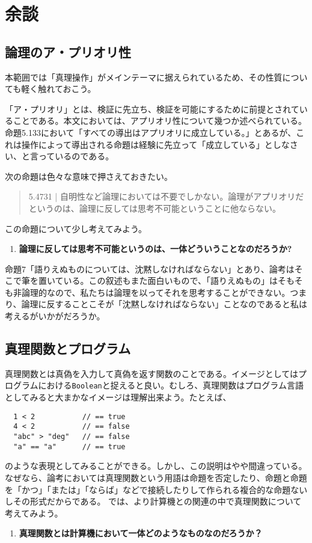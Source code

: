 \documentclass[a4paper,onecolumn,article]{jarticle}
\newcounter{ct}               %
\begin{document}
\section{余談}

\subsection{論理のア・プリオリ性}

本範囲では「真理操作」がメインテーマに据えられているため、その性質についても軽く触れておこう。

「ア・プリオリ」とは、検証に先立ち、検証を可能にするために前提とされていることである。本文においては、アプリオリ性について幾つか述べられている。命題5.133において「すべての導出はアプリオリに成立している。」とあるが、これは操作によって導出される命題は経験に先立って「成立している」としなさい、と言っているのである。

次の命題は色々な意味で押さえておきたい。
\begin{quote}

  5.4731 | 自明性など論理においては不要でしかない。論理がアプリオリだというのは、論理に反しては思考不可能ということに他ならない。

\end{quote}

この命題について少し考えてみよう。
\begin{enumerate}
  \item {\bf 論理に反しては思考不可能というのは、一体どういうことなのだろうか? }
\end{enumerate}

命題7「語りえぬものについては、沈黙しなければならない」とあり、論考はそこで筆を置いている。この叙述もまた面白いもので、「語りえぬもの」はそもそも非論理的なので、私たちは論理を以ってそれを思考することができない。つまり、論理に反することこそが「沈黙しなければならない」ことなのであると私は考えるがいかがだろうか。

\subsection{真理関数とプログラム}

真理関数とは真偽を入力して真偽を返す関数のことである。イメージとしてはプログラムにおける\texttt{Boolean}と捉えると良い。むしろ、真理関数はプログラム言語としてみると大まかなイメージは理解出来よう。たとえば、
\begin{verbatim}
  1 < 2           // == true
  4 < 2           // == false
  "abc" > "deg"   // == false
  "a" == "a"      // == true
\end{verbatim}
のような表現としてみることができる。しかし、この説明はやや間違っている。なぜなら、論考においては真理関数という用語は命題を否定したり、命題と命題を「かつ」「または」「ならば」などで接続したりして作られる複合的な命題ないしその形式だからである。
では、より計算機との関連の中で真理関数について考えてみよう。
\begin{enumerate}
  \item {\bf 真理関数とは計算機において一体どのようなものなのだろうか？ }
\end{enumerate}
\end{document}
